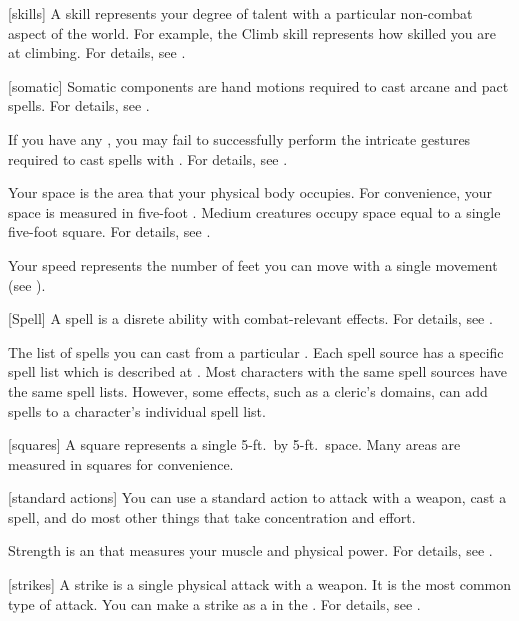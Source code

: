 [skills] A skill represents your degree of talent with a particular non-combat aspect of the world.
For example, the Climb skill represents how skilled you are at climbing.
For details, see .

[somatic] Somatic components are hand motions required to cast arcane and pact spells.
For details, see .

 If you have any , you may fail to successfully perform the intricate gestures required to cast spells with .
For details, see .

 Your space is the area that your physical body occupies.
For convenience, your space is measured in five-foot .
Medium creatures occupy space equal to a single five-foot square.
For details, see .

 Your speed represents the number of feet you can move with a single movement (see ).

[Spell] A spell is a disrete \magical ability with combat-relevant effects.
For details, see .

 The list of spells you can cast from a particular .
Each spell source has a specific spell list which is described at .
Most characters with the same spell sources have the same spell lists.
However, some effects, such as a cleric's domains, can add spells to a character's individual spell list.

[squares] A square represents a single 5-ft.\ by 5-ft.\ space.
Many areas are measured in squares for convenience.

[standard actions] You can use a standard action to attack with a weapon, cast a spell, and do most other things that take concentration and effort.

 Strength is an  that measures your muscle and physical power.
For details, see .

[strikes] A strike is a single physical attack with a weapon.
It is the most common type of attack.
You can make a strike as a  in the .
For details, see .

